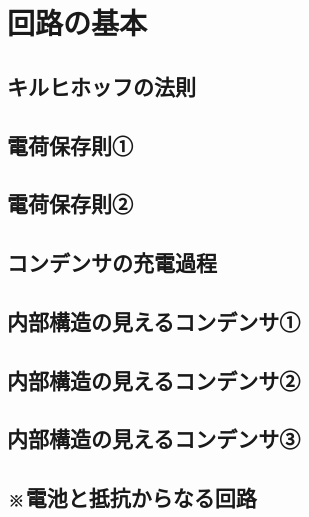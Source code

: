 \documentclass[../../uem_phy_std_q.tex]{subfiles}
\begin{document}
    \section{回路の基本}
    \subsection{キルヒホッフの法則}
            
        \vspace{20pt}
        \vfill
    \subsection{電荷保存則①}
        
        \vspace{20pt}
        \vfill
    \subsection{電荷保存則②}
        
        \vspace{20pt}
        \vfill
    \subsection{コンデンサの充電過程}
        
        \vspace{20pt}
        \vfill
    \subsection{内部構造の見えるコンデンサ①}
        
        \vspace{20pt}
        \vfill
    \subsection{内部構造の見えるコンデンサ②}
        
        \vspace{20pt}
        \vfill
    \subsection{内部構造の見えるコンデンサ③}
        
        \vspace{20pt}
        \vfill
    \subsection{※電池と抵抗からなる回路}
        
        \vspace{20pt}
        \vfill
\end{document}
